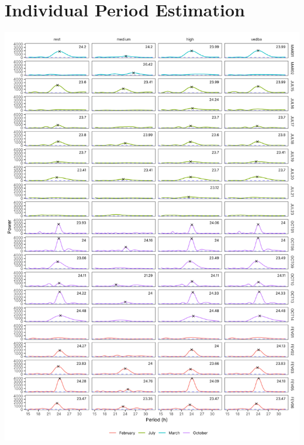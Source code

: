 \documentclass[msc,numbers,hidelinks]{coppe}
\begin{document}
  \hypertarget{individual-period-estimation}{%
  \section{Individual Period Estimation}\label{individual-period-estimation}}
  \begin{center}\includegraphics[width=1\linewidth]{../04_figures/periodogram/periodogram} \end{center}
\end{document}
